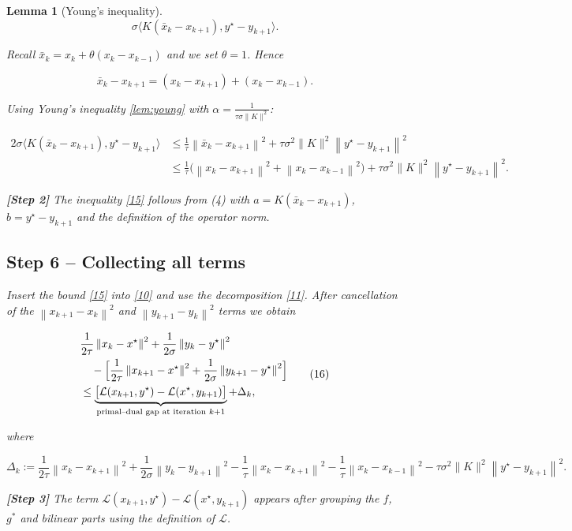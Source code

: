 \documentclass{article}
\newtheorem{lemma}{Lemma}
\newcommand{\ip}[2]{\langle #1,#2\rangle}
\newcommand{\norm}[1]{\left\|#1\right\|}
\begin{document}
\begin{lemma}[Young’s inequality]
\[
\sigma\ip{K(\bar x_{k}-x_{k+1})}{y^{\star}-y_{k+1}} .
\tag{13}
\]

Recall $\bar x_{k}=x_{k}+ \theta (x_{k}-x_{k-1})$ and we set $\theta=1$. Hence  

\[
\bar x_{k}-x_{k+1}= (x_{k}-x_{k+1})+(x_{k}-x_{k-1}) .
\tag{14}
\]

Using Young’s inequality \eqref{lem:young} with $\alpha=\frac{1}{\tau\sigma\|K\|^{2}}$:

\[
\begin{aligned}
2\sigma\ip{K(\bar x_{k}-x_{k+1})}{y^{\star}-y_{k+1}}
&\le \frac{1}{\tau}\norm{\bar x_{k}-x_{k+1}}^{2}
   +\tau\sigma^{2}\|K\|^{2}\norm{y^{\star}-y_{k+1}}^{2}\\
&\le \frac{1}{\tau}\bigl(\norm{x_{k}-x_{k+1}}^{2}
    +\norm{x_{k}-x_{k-1}}^{2}\bigr)
   +\tau\sigma^{2}\|K\|^{2}\norm{y^{\star}-y_{k+1}}^{2}.
\end{aligned}
\tag{15}
\]

\textbf{[Step 2]} The inequality \eqref{15} follows from (4) with $a=K(\bar x_{k}-x_{k+1})$, $b=y^{\star}-y_{k+1}$ and the definition of the operator norm.

\subsection*{Step 6 – Collecting all terms}
Insert the bound \eqref{15} into \eqref{10} and use the decomposition \eqref{11}. After cancellation of the $\norm{x_{k+1}-x_{k}}^{2}$ and $\norm{y_{k+1}-y_{k}}^{2}$ terms we obtain

\[
\begin{aligned}
&\frac{1}{2\tau}\norm{x_{k}-x^{\star}}^{2}
 +\frac{1}{2\sigma}\norm{y_{k}-y^{\star}}^{2} \\
&\quad -\Bigl[\frac{1}{2\tau}\norm{x_{k+1}-x^{\star}}^{2}
          +\frac{1}{2\sigma}\norm{y_{k+1}-y^{\star}}^{2}\Bigr] \\
&\le
\underbrace{\bigl[\mathcal L(x_{k+1},y^{\star})-\mathcal L(x^{\star},y_{k+1})\bigr]}_{\text{primal–dual gap at iteration }k+1}
+ \Delta_{k},
\end{aligned}
\tag{16}
\]

where  

\[
\Delta_{k}:=
\frac{1}{2\tau}\norm{x_{k}-x_{k+1}}^{2}
+\frac{1}{2\sigma}\norm{y_{k}-y_{k+1}}^{2}
-\frac{1}{\tau}\norm{x_{k}-x_{k+1}}^{2}
-\frac{1}{\tau}\norm{x_{k}-x_{k-1}}^{2}
-\tau\sigma^{2}\|K\|^{2}\norm{y^{\star}-y_{k+1}}^{2}.
\tag{17}
\]

\textbf{[Step 3]} The term $\mathcal L(x_{k+1},y^{\star})-\mathcal L(x^{\star},y_{k+1})$ appears after grouping the $f$, $g^{*}$ and bilinear parts using the definition of $\mathcal L$.


\end{lemma}
\end{document}
